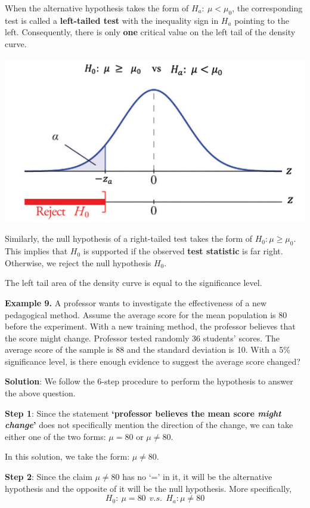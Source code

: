 \documentclass[
]{book}
\begin{document}
When the alternative hypothesis takes the form of \(H_a: \ \mu < \mu_0\), the corresponding test is called a \textbf{left-tailed test} with the inequality sign in \(H_a\) pointing to the left. Consequently, there is only \textbf{one} critical value on the left tail of the density curve.

\begin{center}\includegraphics[width=0.5\linewidth]{week08/leftTailedTest} \end{center}

Similarly, the null hypothesis of a right-tailed test takes the form of \(H_0: \mu \ge \mu_0\). This implies that \(H_0\) is supported if the observed \textbf{test statistic} is far right. Otherwise, we reject the null hypothesis \(H_0\).

The left tail area of the density curve is equal to the significance level.

\hfill\break

\textbf{Example 9.} A professor wants to investigate the effectiveness of a new pedagogical method. Assume the average score for the mean population is 80 before the experiment. With a new training method, the professor believes that the score might change. Professor tested randomly 36 students' scores. The average score of the sample is 88 and the standard deviation is 10. With a 5\% significance level, is there enough evidence to suggest the average score changed?

\hfill\break
\textbf{Solution}: We follow the 6-step procedure to perform the hypothesis to answer the above question.

\textbf{Step 1}: Since the statement \textbf{`professor believes the mean score \emph{might change}' } does not specifically mention the direction of the change, we can take either one of the two forms: \(\mu = 80\) or \(\mu \ne 80\).

In this solution, we take the form: \(\mu \ne 80\).

\textbf{Step 2}: Since the claim \(\mu \ne 80\) has no `=' in it, it will be the alternative hypothesis and the opposite of it will be the null hypothesis. More specifically,
\[H_0: \ \mu = 80 \ \ v.s. \ \ H_a: \mu \ne 80  \]
\end{document}
